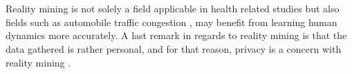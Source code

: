 \\\\
Reality mining is not solely a field applicable in health related studies but also fields such as automobile traffic congestion \parencite{pentland2009reality_mining_mobile_communication_gps}, may benefit from learning human dynamics more accurately. A last remark in regards to reality mining is that the data gathered is rather personal, and for that reason, privacy is a concern with reality mining \parencite{madan2009_reality_mining_privacy}.

